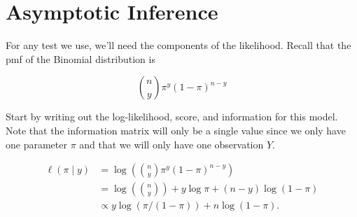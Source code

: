 \documentclass[
  letterpaper,
  DIV=11,
  numbers=noendperiod]{scrreport}
\begin{document}
\hypertarget{asymptotic-inference}{%
\section{Asymptotic Inference}\label{asymptotic-inference}}

For any test we use, we'll need the components of the likelihood. Recall
that the pmf of the Binomial distribution is

\[{n \choose y} \pi^y (1-\pi)^{n-y}\]

Start by writing out the log-likelihood, score, and information for this
model. Note that the information matrix will only be a single value
since we only have one parameter \(\pi\) and that we will only have one
observation \(Y\).

\[\begin{aligned}
\ell(\pi \mid y) & = \log \left( {n \choose y} \pi^y (1-\pi)^{n-y} \right) \\
& = \log({n \choose y}) + y \log \pi + (n - y) \log (1-\pi) \\
& \propto y \log( \pi / (1-\pi)) + n \log (1-\pi).\end{aligned} \]
\end{document}

